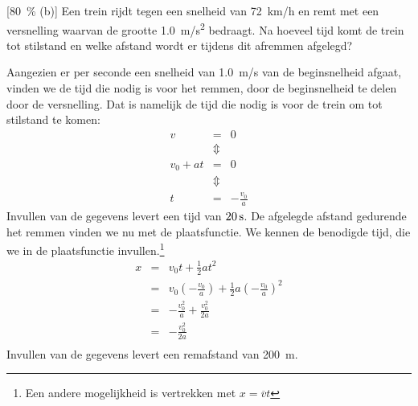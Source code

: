 

[\SI{80}{\percent} (b)] Een trein rijdt tegen een snelheid van \SI{72}{km/h} en remt met een versnelling waarvan de grootte \SI{1,0}{m/s^2} bedraagt. Na hoeveel tijd komt de trein tot stilstand en welke afstand wordt er tijdens dit afremmen afgelegd?

\begin{oplossing}
    Aangezien er per seconde een snelheid van \SI{1,0}{m/s} van de beginsnelheid afgaat, vinden we de tijd die nodig is voor het remmen, door de beginsnelheid te delen door de versnelling. Dat is namelijk de tijd die nodig is voor de trein om tot stilstand te komen:
    \begin{eqnarray*}
        v&=&0\\
        &\Updownarrow&\\
        v_0+at&=&0\\
        &\Updownarrow&\\
        t&=&-\frac{v_0}{a}
    \end{eqnarray*}
    Invullen van de gegevens levert een tijd van $20\rm\,s$. De afgelegde afstand gedurende het remmen vinden we nu met de plaatsfunctie. We kennen de benodigde tijd, die we in de plaatsfunctie invullen.\footnote{Een andere mogelijkheid is vertrekken met $x=\overline{v}t$}
    \begin{eqnarray*}
        x&=&v_0t+\frac{1}{2}at^2\\
        &=&v_0\left(-\frac{v_0}{a}\right)+\frac{1}{2}a\left(-\frac{v_0}{a}\right)^2\\
        &=&-\frac{v_0^2}{a}+\frac{v_0^2}{2a}\\
        &=&-\frac{v_0^2}{2a}\\
    \end{eqnarray*}
    Invullen van de gegevens levert een remafstand van \SI{200}{m}. 
\end{oplossing}